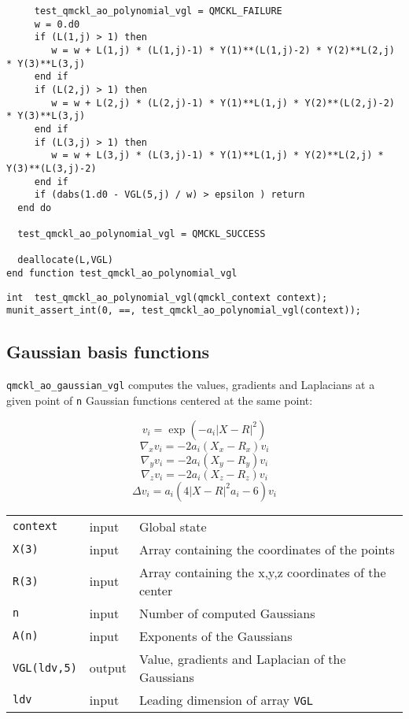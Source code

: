 \begin{verbatim}
     test_qmckl_ao_polynomial_vgl = QMCKL_FAILURE
     w = 0.d0
     if (L(1,j) > 1) then
        w = w + L(1,j) * (L(1,j)-1) * Y(1)**(L(1,j)-2) * Y(2)**L(2,j) * Y(3)**L(3,j) 
     end if
     if (L(2,j) > 1) then
        w = w + L(2,j) * (L(2,j)-1) * Y(1)**L(1,j) * Y(2)**(L(2,j)-2) * Y(3)**L(3,j) 
     end if
     if (L(3,j) > 1) then
        w = w + L(3,j) * (L(3,j)-1) * Y(1)**L(1,j) * Y(2)**L(2,j) * Y(3)**(L(3,j)-2) 
     end if
     if (dabs(1.d0 - VGL(5,j) / w) > epsilon ) return
  end do

  test_qmckl_ao_polynomial_vgl = QMCKL_SUCCESS

  deallocate(L,VGL)
end function test_qmckl_ao_polynomial_vgl
\end{verbatim}

\begin{verbatim}
int  test_qmckl_ao_polynomial_vgl(qmckl_context context);
munit_assert_int(0, ==, test_qmckl_ao_polynomial_vgl(context));
\end{verbatim}

\subsection{Gaussian basis functions}
\label{sec:org29184a6}

\texttt{qmckl\_ao\_gaussian\_vgl} computes the values, gradients and
Laplacians at a given point of \texttt{n} Gaussian functions centered at
the same point:

\[ v_i = \exp(-a_i |X-R|^2) \]
\[ \nabla_x v_i = -2 a_i (X_x -  R_x) v_i \]
\[ \nabla_y v_i = -2 a_i (X_y -  R_y) v_i \]
\[ \nabla_z v_i = -2 a_i (X_z -  R_z) v_i \]
\[ \Delta v_i = a_i (4 |X-R|^2 a_i - 6) v_i \]

\begin{center}
\begin{tabular}{lll}
\texttt{context} & input & Global state\\
\texttt{X(3)} & input & Array containing the coordinates of the points\\
\texttt{R(3)} & input & Array containing the x,y,z coordinates of the center\\
\texttt{n} & input & Number of computed Gaussians\\
\texttt{A(n)} & input & Exponents of the Gaussians\\
\texttt{VGL(ldv,5)} & output & Value, gradients and Laplacian of the Gaussians\\
\texttt{ldv} & input & Leading dimension of array \texttt{VGL}\\
\end{tabular}
\end{center}

